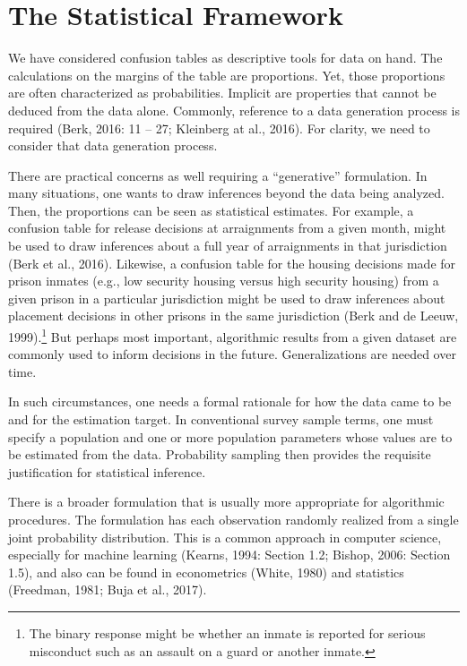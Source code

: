 \documentclass[12pt]{article}
\begin{document}
\section{The Statistical Framework}

We have considered confusion tables as descriptive tools for data on hand. The calculations on the margins of the table are proportions. Yet, those proportions are often characterized as probabilities. Implicit are properties that cannot be deduced from the data alone. Commonly, reference to a data generation process is required (Berk, 2016: 11 -- 27; Kleinberg at al., 2016). For clarity, we need to consider that data generation process.

There are practical concerns as well requiring a ``generative'' formulation. In many situations, one wants to draw inferences beyond the data being analyzed. Then, the proportions can be seen as statistical estimates. For example, a confusion table for release decisions at arraignments from a given month, might be used to draw inferences about a full year of arraignments in that jurisdiction (Berk et al., 2016). Likewise, a confusion table for the housing decisions made for prison inmates (e.g., low security housing versus high security housing) from a given prison in a particular jurisdiction might be used to draw inferences about placement decisions in other prisons in the same jurisdiction (Berk and de Leeuw, 1999).\footnote
{
The binary response might be whether an inmate is reported for serious misconduct such as an assault on a guard or another inmate.
}
But perhaps most important, algorithmic results from a given dataset are commonly used to inform decisions in the future. Generalizations are needed over time. 

In such circumstances, one needs a formal rationale for how the data came to be and for the estimation target. In conventional survey sample terms, one must specify a population and one or more population parameters whose values are to be estimated from the data. Probability sampling then provides the requisite justification for statistical inference.

There is a broader formulation that is usually more appropriate for algorithmic procedures. The formulation has each observation randomly realized from a single joint probability distribution. This is a common approach in computer science, especially for machine learning (Kearns, 1994: Section 1.2; Bishop, 2006: Section 1.5), and also can be found in econometrics (White, 1980) and statistics (Freedman, 1981; Buja et al., 2017). 
\end{document}
